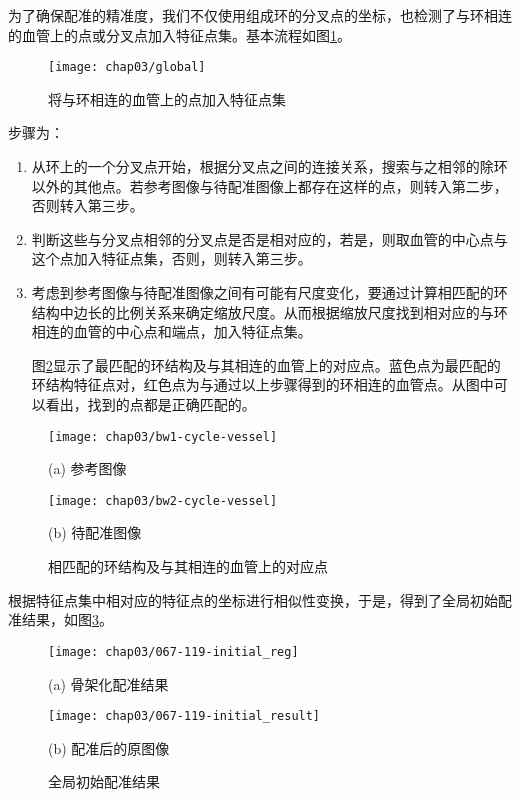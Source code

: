 为了确保配准的精准度，我们不仅使用组成环的分叉点的坐标，也检测了与环相连的血管上的点或分叉点加入特征点集。基本流程如图\ref{fig:global}。
\begin{figure}[!ht]
  \centering
  \texttt{[image: chap03/global]}
  \caption{将与环相连的血管上的点加入特征点集}
  \label{fig:global}
\end{figure}

步骤为：
\begin{enumerate}
\item 从环上的一个分叉点开始，根据分叉点之间的连接关系，搜索与之相邻的除环以外的其他点。若参考图像与待配准图像上都存在这样的点，则转入第二步，否则转入第三步。
\item 判断这些与分叉点相邻的分叉点是否是相对应的，若是，则取血管的中心点与这个点加入特征点集，否则，则转入第三步。
\item 考虑到参考图像与待配准图像之间有可能有尺度变化，要通过计算相匹配的环结构中边长的比例关系来确定缩放尺度。从而根据缩放尺度找到相对应的与环相连的血管的中心点和端点，加入特征点集。

图\ref{fig:global points}显示了最匹配的环结构及与其相连的血管上的对应点。蓝色点为最匹配的环结构特征点对，红色点为与通过以上步骤得到的环相连的血管点。从图中可以看出，找到的点都是正确匹配的。
\end{enumerate}


\begin{figure}
\centering
  \begin{minipage}[b]{0.48\textwidth} 
      \centering 
      \texttt{[image: chap03/bw1-cycle-vessel]}
        \centerline{(a) 参考图像}\medskip
    \end{minipage}
  \begin{minipage}[b]{0.48\textwidth}
    \centering
    \texttt{[image: chap03/bw2-cycle-vessel]}
      \centerline{(b) 待配准图像}\medskip
  \end{minipage}
\caption{相匹配的环结构及与其相连的血管上的对应点}
\label{fig:global points}
\end{figure}


根据特征点集中相对应的特征点的坐标进行相似性变换，于是，得到了全局初始配准结果，如图\ref{fig:global results}。


\begin{figure}
\centering
  \begin{minipage}[b]{0.48\textwidth} 
      \centering 
      \texttt{[image: chap03/067-119-initial\_reg]}
        \centerline{(a) 骨架化配准结果}\medskip
    \end{minipage}
  \begin{minipage}[b]{0.48\textwidth}
    \centering
    \texttt{[image: chap03/067-119-initial\_result]}
      \centerline{(b) 配准后的原图像}\medskip
  \end{minipage}
\caption{全局初始配准结果}
\label{fig:global results}
\end{figure}




